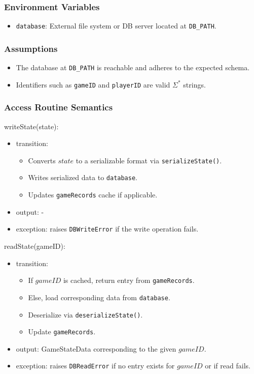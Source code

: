 \documentclass[12pt, titlepage]{article}
\begin{document}
\subsubsection{Environment Variables}
\begin{itemize}
\item \texttt{database}: External file system or DB server located at \texttt{DB\_PATH}.
\end{itemize}

\subsubsection{Assumptions}
\begin{itemize}
    \item The database at \texttt{DB\_PATH} is reachable and adheres to the expected schema.
    \item Identifiers such as \texttt{gameID} and \texttt{playerID} are valid $\Sigma^{*}$ strings.
\end{itemize}

\subsubsection{Access Routine Semantics}

\noindent writeState(state):
\begin{itemize}
\item transition:
    \begin{itemize}
        \item Converts $state$ to a serializable format via \texttt{serializeState()}.
        \item Writes serialized data to \texttt{database}.
        \item Updates \texttt{gameRecords} cache if applicable.
    \end{itemize}
\item output: -
\item exception: raises \texttt{DBWriteError} if the write operation fails.
\end{itemize}

\noindent readState(gameID):
\begin{itemize}
\item transition:
    \begin{itemize}
        \item If $gameID$ is cached, return entry from \texttt{gameRecords}.
        \item Else, load corresponding data from \texttt{database}.
        \item Deserialize via \texttt{deserializeState()}.
        \item Update \texttt{gameRecords}.
    \end{itemize}
\item output: GameStateData corresponding to the given $gameID$.
\item exception: raises \texttt{DBReadError} if no entry exists for $gameID$ or if read fails.
\end{itemize}
\end{document}

